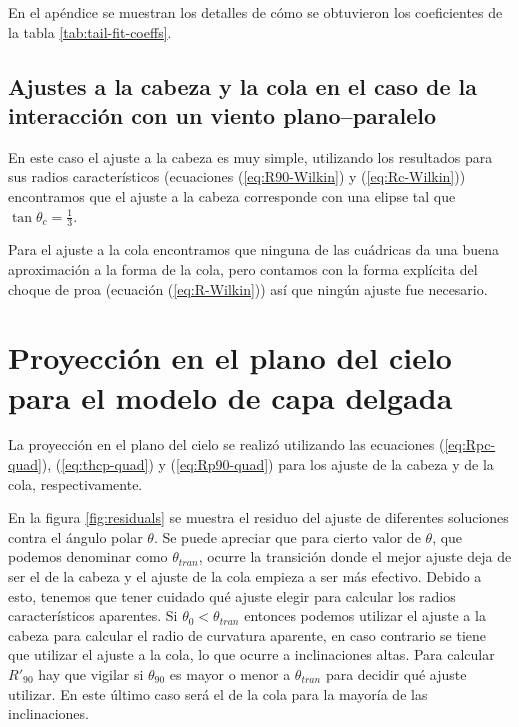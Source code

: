  
 En el apéndice  se muestran los detalles de cómo se obtuvieron los coeficientes de la tabla \ref{tab:tail-fit-coeffs}.
 
 \subsection{Ajustes a la cabeza y la cola en el caso de la interacción con un viento plano--paralelo}

 En este caso el ajuste a la cabeza es muy simple, utilizando los resultados para sus radios característicos
 (ecuaciones (\ref{eq:R90-Wilkin}) y (\ref{eq:Rc-Wilkin})) encontramos que el ajuste a la cabeza corresponde
 con una elipse tal que $\tan\theta_c = \frac{1}{3}$.

 Para el ajuste a la cola encontramos que ninguna de las cuádricas da una buena aproximación a la forma de la
 cola, pero contamos con la forma explícita del choque de proa (ecuación (\ref{eq:R-Wilkin})) así que ningún
 ajuste fue necesario.
 
 \section[Proyección en el Plano del Cielo]{Proyección en el plano del cielo para el modelo de capa delgada}

 La proyección en el plano del cielo se realizó utilizando las ecuaciones (\ref{eq:Rpc-quad}), (\ref{eq:thcp-quad})
 y (\ref{eq:Rp90-quad}) para los ajuste de la cabeza y de la cola, respectivamente.

 En la figura \ref{fig:residuals} se muestra el residuo del ajuste de diferentes soluciones contra el ángulo polar
 $\theta$. Se puede apreciar que para cierto valor de $\theta$, que podemos denominar como $\theta_{tran}$, ocurre
 la transición donde el mejor ajuste deja de ser el de la cabeza y el ajuste de la cola empieza a ser más efectivo.
 Debido a esto, tenemos que tener cuidado qué ajuste elegir para calcular los radios característicos aparentes. Si
 $\theta_0 < \theta_{tran}$ entonces podemos utilizar el ajuste a la cabeza para calcular el radio de curvatura
 aparente, en caso contrario se tiene que utilizar el ajuste a la cola, lo que ocurre a inclinaciones altas.
 Para calcular $R'_{90}$ hay que vigilar si $\theta_{90}$ es mayor o menor a $\theta_{tran}$ para decidir qué ajuste
 utilizar. En este último caso será el de la cola para la mayoría de las inclinaciones.

